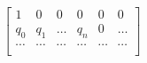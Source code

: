 \documentclass[preview]{standalone}
\begin{document}
\begin{align*}
\begin{bmatrix}1 & 0 & 0 & 0 & 0 & 0 \\q_0 & q_1 & \ldots & q_n & 0 & \ldots \\\cdots & \cdots & \cdots & \cdots & \cdots & \cdots \\\end{bmatrix}
\end{align*}
\end{document}
